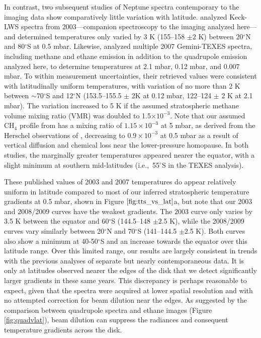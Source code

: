 \documentclass[twocolumn,10pt]{aastex631}
\begin{document}
In contrast, two subsequent studies of Neptune spectra contemporary to the imaging data show comparatively little variation with latitude. \citet{fletcher2014neptune} analyzed Keck-LWS spectra from 2003---companion spectroscopy to the imaging analyzed here---and determined temperatures only varied by 3 K (155--158 $\pm$2 K) between 20$^{\circ}$N and 80$^{\circ}$S at 0.5 mbar.  Likewise, \citet{greathouse2011spatially} analyzed multiple 2007 Gemini-TEXES spectra, including methane and ethane emission in addition to the quadrupole emission analyzed here, to determine temperatures at 2.1 mbar, 0.12 mbar, and 0.007 mbar. To within measurement uncertainties, their retrieved values were consistent with latitudinally uniform temperatures, with variation of no more than 2 K between $\sim$70$^{\circ}$S and 12$^{\circ}$N (153.5--155.5 $\pm$ 2K at 0.12 mbar, 122--124 $\pm$ 2 K at 2.1 mbar). The variation increased to 5 K if the assumed stratospheric methane volume mixing ratio (VMR) was doubled to 1.5$\times10^{-3}$. Note that our assumed CH$_4$ profile from \citet{moses2018seasonal} has a mixing ratio of $1.15\times10^{-3}$ at 5 mbar, as derived from the Herschel observations of \citet{lellouch2015new}, decreasing to $0.9\times10^{-3}$ at 0.5 mbar as a result of vertical diffusion and chemical loss near the lower-pressure homopause. In both studies, the marginally greater temperatures appeared nearer the equator, with a slight minimum at southern mid-latitudes (i.e.,\ 55$^{\circ}$S in the TEXES analysis). 

%            
These published values of 2003 and 2007 temperatures do appear relatively uniform in latitude compared to most of our inferred stratospheric temperature gradients at 0.5 mbar, shown in Figure $\ref{fig:tts_vs_lat}$a, but note that our 2003 and 2008/2009 curves have the weakest gradients. The 2003 curve only varies by 3.5 K between the equator and 60$^{\circ}$S (144.5--148 $\pm$2.5 K), while the 2008/2009 curves vary similarly between 20$^{\circ}$N and 70$^{\circ}$S (141--144.5 $\pm$2.5 K). Both curves also show a minimum at 40-50$^{\circ}$S and an increase towards the equator over this latitude range. Over this limited range, our results are largely consistent in trends with the previous analyses of separate but nearly contemporaneous data. It is only at latitudes observed nearer the edges of the disk that we detect significantly larger gradients in these same years. This discrepancy is perhaps reasonable to expect, given that the spectra were acquired at lower spatial resolution and with no attempted correction for beam dilution near the edges.  As suggested by the comparison between quadrupole spectra and ethane images (Figure \ref{fig:quadvlat}), beam dilution can suppress the radiances and consequent temperature gradients across the disk. 
\end{document}

